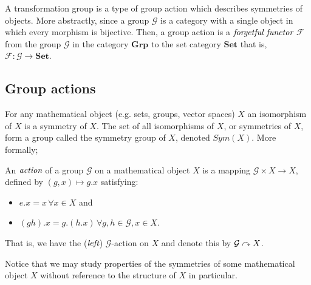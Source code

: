 A transformation group is a type of group action which describes symmetries of objects. More abstractly,
since a group $\mathcal{G}$ is a category with a single object in which every morphism is bijective.
Then, a group action is a $\emph{forgetful functor}$ $\mathcal{F}$ from the group $\mathcal{G}$ in the category $\textbf{Grp}$
to the set category $\textbf{Set}$ that is, $\mathcal{F} : \mathcal{G} \to \textbf{Set}$.

\subsection{Group actions} %
\label{subsec:groupaction}

For any mathematical object (e.g. sets, groups, vector spaces) $X$ an isomorphism
of $X$ is a symmetry of $X$. The set of all isomorphisms of $X$, or symmetries
of $X$, form a group called the symmetry group of $X$, denoted $Sym(X)$.
More formally;

\begin{defn}
	An $\emph{action}$ of a group $\mathcal{G}$ on a mathematical object $X$ is
	a mapping $\mathcal{G} \times X \to X$, defined by $(g,x) \mapsto g . x$
	satisfying:
	\begin{itemize}
			\item $e . x = x \, \forall x \in X$ and
			\item $(g h) . x = g . (h . x) \, \forall g,h \in \mathcal{G}, x \in X$.
	\end{itemize}
	That is, we have the ($\emph{left}$) $\mathcal{G}$-action on $X$ and denote this
	by $\mathcal{G} \curvearrowright X$.
\end{defn}

Notice that we may study properties of the symmetries of some mathematical object $X$
without reference to the structure of $X$ in particular.

